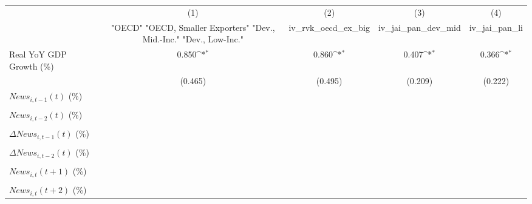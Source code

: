 {
\def\sym#1{\ifmmode^{#1}\else\(^{#1}\)\fi}
\begin{tabular}{l*{4}{c}}
\toprule
                    &\multicolumn{1}{c}{(1)}&\multicolumn{1}{c}{(2)}&\multicolumn{1}{c}{(3)}&\multicolumn{1}{c}{(4)}\\
                    &\multicolumn{1}{c}{ "OECD" "OECD, Smaller Exporters" "Dev., Mid.-Inc." "Dev., Low-Inc."}&\multicolumn{1}{c}{iv_rvk_oecd_ex_big}&\multicolumn{1}{c}{iv_jai_pan_dev_mid}&\multicolumn{1}{c}{iv_jai_pan_li}\\
\midrule
Real YoY GDP Growth (\%)&       0.850\sym{*}  &       0.860\sym{*}  &       0.407\sym{*}  &       0.366\sym{*}  \\
                    &     (0.465)         &     (0.495)         &     (0.209)         &     (0.222)         \\
\addlinespace
$ News_{i,t-1}(t)$ (\%)&                     &                     &                     &                     \\
                    &                     &                     &                     &                     \\
\addlinespace
$ News_{i,t-2}(t)$ (\%)&                     &                     &                     &                     \\
                    &                     &                     &                     &                     \\
\addlinespace
$ \Delta News_{i,t-1}(t)$ (\%)&                     &                     &                     &                     \\
                    &                     &                     &                     &                     \\
\addlinespace
$ \Delta News_{i,t-2}(t)$ (\%)&                     &                     &                     &                     \\
                    &                     &                     &                     &                     \\
\addlinespace
$ News_{i,t}(t+1)$ (\%)&                     &                     &                     &                     \\
                    &                     &                     &                     &                     \\
\addlinespace
$ News_{i,t}(t+2)$ (\%)&                     &                     &                     &                     \\

\end{tabular}}
